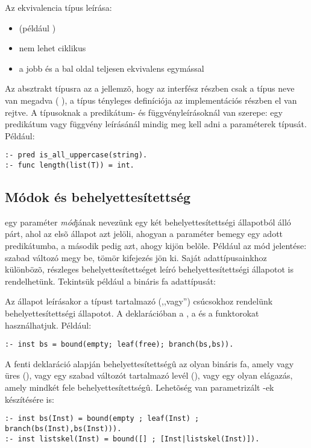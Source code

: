 Az ekvivalencia típus leírása:

\begin{itemize}
\item {}  \cd{==}  (például
)
\item nem lehet ciklikus
\item a jobb és a bal oldal teljesen ekvivalens egymással
\end{itemize}

Az absztrakt típusra az a jellemzõ, hogy az interfész részben csak a típus neve
van megadva ( ), a típus tényleges definíciója az
implementációs részben el van rejtve.
\br
A típusoknak a predikátum- és függvényleírásoknál van szerepe: egy predikátum
vagy függvény leírásánál mindig meg kell adni a paraméterek típusát. Például:

\begin{verbatim}
:- pred is_all_uppercase(string).
:- func length(list(T)) = int.
\end{verbatim}

\subsection{Módok és behelyettesítettség}

 egy paraméter \emph{mód}jának nevezünk egy két behelyettesítettségi állapotból
álló párt, ahol az elsõ állapot azt jelöli, ahogyan a paraméter bemegy egy adott
predikátumba, a második pedig azt, ahogy kijön belõle. Például az  mód jelentése:
szabad változó megy be, tömör kifejezés jön ki.
\br
Saját adattípusainkhoz különbözõ, részleges behelyettesítettséget leíró behelyettesítettségi
állapotot is rendelhetünk. Tekintsük például a bináris fa adattípusát:


Az állapot leírásakor a típust tartalmazó (,,vagy'') csúcsokhoz rendelünk
behelyettesítettségi állapotot. A deklarációban a , a  és a
 funktorokat használhatjuk. Például:
\begin{verbatim}
:- inst bs = bound(empty; leaf(free); branch(bs,bs)).
\end{verbatim}
A fenti deklaráció alapján  behelyettesítettségû az olyan bináris fa, amely
vagy üres (), vagy egy szabad változót tartalmazó levél (),
vagy egy olyan elágazás, amely mindkét fele  behelyettesítettségû. Lehetõség
van parametrizált -ek készítésére is:
\begin{verbatim}
:- inst bs(Inst) = bound(empty ; leaf(Inst) ; branch(bs(Inst),bs(Inst))).
:- inst listskel(Inst) = bound([] ; [Inst|listskel(Inst)]).
\end{verbatim}

